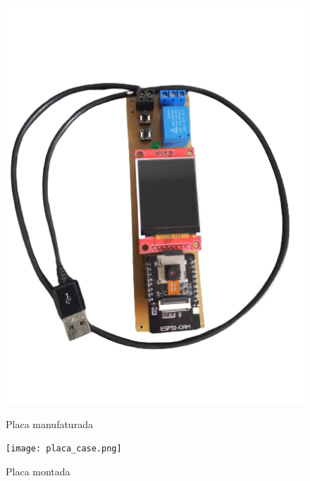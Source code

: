 \begin{figure}[h!]
    \centering
    \caption{Placa manufaturada}
    \includegraphics[scale=0.45]{figuras/placa_montada.png}
    \fonte{}%
    \label{fig:placamanufaturada}
    \centering
\end{figure}

\begin{figure}[h!]
    \centering
    \caption{Placa montada}
    \texttt{[image: placa\_case.png]}
    \fonte{}%
    \label{fig:placamontada}
    \centering
\end{figure}